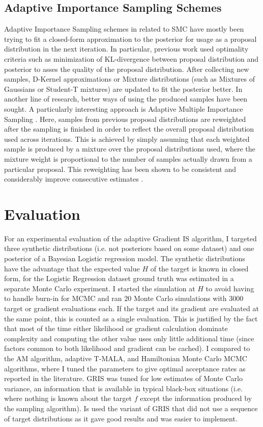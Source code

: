 \subsection{Adaptive Importance Sampling Schemes}

Adaptive Importance Sampling schemes in related to SMC have mostly been trying to fit a closed-form approximation to the posterior for usage as a proposal distribution in the next iteration. In particular, previous work used optimality criteria such as minimization of KL-divergence between proposal distribution and posterior to asses the quality of the proposal distribution. After collecting new samples, D-Kernel approximations \cite{Douc2007} or Mixture distributions (such as Mixtures of Gaussians or Student-T mixtures) \cite{Cappe2008} are updated to fit the posterior better.
In another line of research, better ways of using the produced samples have been sought. A particularly interesting approach is Adaptive Multiple Importance Sampling \cite{Cornuet2012,Marin2012}. Here, samples from previous proposal distributions are reweighted after the sampling is finished in order to reflect the overall proposal distribution used across iterations. This is achieved by simply assuming that each weighted sample is produced by a mixture over the proposal distributions used, where the mixture weight is proportional to the number of samples actually drawn from a particular proposal. This reweighting has been shown to be consistent and considerably improve consecutive estimates \cite{Marin2012}.

\section{Evaluation}
\label{sec:eval}
For an experimental evaluation of the adaptive Gradient IS algorithm, I targeted three synthetic distributions (i.e. not posteriors based on some dataset) and one posterior of a Bayesian Logistic regression model. The synthetic distributions have the advantage that the expected value $H$ of the target is known in closed form, for the Logistic Regression dataset ground truth was estimated in a separate Monte Carlo experiment. I started the simulation at $H$ to avoid having to handle burn-in for MCMC and ran $20$ Monte Carlo simulations with $3000$ target or gradient evaluations each. If the target and its gradient are evaluated at the same point, this is counted as a single evaluation. This is justified by the fact that most of the time either likelihood or gradient calculation dominate complexity and computing the other value uses only little additional time (since factors common to both likelihood and gradient can be cached).  I compared to the AM algorithm, adaptive T-MALA, and Hamiltonian Monte Carlo \cite{Neal2011} MCMC algorithms, where I tuned the parameters to give optimal acceptance rates as reported in the literature. GRIS was tuned for low estimates of Monte Carlo variance, an information that is available in typical black-box situations (i.e. where nothing is known about the target $f$ except the information produced by the sampling algorithm). Is used the variant of GRIS that did not use a sequence of target distributions as it gave good results and was easier to implement.


